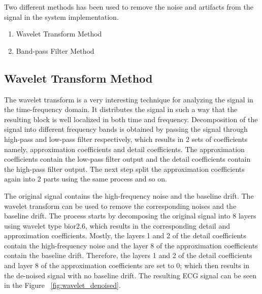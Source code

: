 Two different methods has been used to remove the noise and artifacts from the signal in the system implementation.
 
 \begin{enumerate}
 	\item Wavelet Transform Method
 	\item Band-pass Filter Method
 \end{enumerate}

\subsection{Wavelet Transform Method}

The wavelet transform is a very interesting technique for analyzing the signal in the time-frequency domain. It distributes the signal in such a way that the resulting block is well localized in both time and frequency. Decomposition of the signal into different frequency bands is obtained by passing the signal through high-pass and low-pass filter respectively, which results in 2 sets of coefficients namely, approximation coefficients and detail coefficients. The approximation coefficients contain the low-pass filter output and the detail coefficients contain the high-pass filter output. The next step split the approximation coefficients again into 2 parts using the same process and so on.

The original signal contains the high-frequency noise and the baseline drift. The wavelet transform can be used to remove the corresponding noises and the baseline drift. The process starts by decomposing the original signal into 8 layers using wavelet type bior2.6, which results in the corresponding detail and approximation coefficients. Mostly, the layers 1 and 2 of the detail coefficients contain the high-frequency noise and the layer 8 of the approximation coefficients contain the baseline drift. Therefore, the layers 1 and 2 of the detail coefficients and layer 8 of the approximation coefficients are set to 0; which then results in the de-noised signal with no baseline drift. The resulting ECG signal can be seen in the Figure ~\ref{fig:wavelet_denoised}. 

